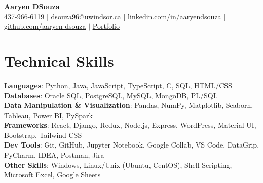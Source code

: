 \documentclass[letterpaper,10.5pt]{article}
\begin{document}

\begin{center}
	\textbf{\Huge Aaryen DSouza} \\ %
	\small 437-966-6119 $|$ \href{mailto:dsouza96@uwindsor.ca}{\underline{\phantom{/}dsouza96@uwindsor.ca\phantom{/}}} $|$
	\href{https://www.linkedin.com/in/aaryendsouza}{\underline{\phantom{/}linkedin.com/in/aaryendsouza\phantom{/}}} $|$
	\href{https://github.com/aaryen-dsouza}{\underline{\phantom{/}github.com/aaryen-dsouza\phantom{/}}} $|$
	\href{https://www.aaryen.vercel.app}{\underline{\phantom{/}Portfolio\phantom{/}}}
\end{center}

\section{Technical Skills}
\begin{itemize}[leftmargin=0.15in, label={}]
	\small{\item{
	      \textbf{Languages}{: Python, Java, JavaScript, TypeScript, C, SQL, HTML/CSS} \\
	      \textbf{Databases}{: Oracle SQL, PostgreSQL, MySQL, MongoDB, PL/SQL} \\
	      \textbf{Data Manipulation \& Visualization}{: Pandas, NumPy, Matplotlib, Seaborn, Tableau, Power BI, PySpark} \\
	      \textbf{Frameworks}{: React, Django, Redux, Node.js, Express, WordPress, Material-UI, Bootstrap, Tailwind CSS} \\
	      \textbf{Dev Tools}{: Git, GitHub, Jupyter Notebook, Google Collab, VS Code, DataGrip, PyCharm, IDEA, Postman, Jira} \\
	      \textbf{Other Skills}{: Windows, Linux/Unix (Ubuntu, CentOS), Shell Scripting, Microsoft Excel, Google Sheets}
	      }}
\end{itemize}


\end{document}

